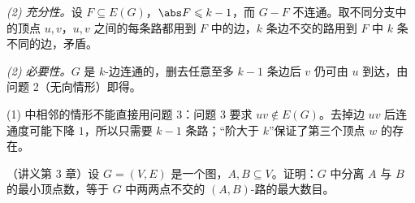 \begin{solution}
\emph{(2) 充分性。}设 $F\subseteq E(G)$，$\abs F\leqslant k-1$，而 $G-F$ 不连通。取不同分支中的顶点 $u,v$，$u,v$ 之间的每条路都用到 $F$ 中的边，$k$ 条边不交的路用到 $F$ 中 $k$ 条不同的边，矛盾。

\emph{(2) 必要性。}$G$ 是 $k$-边连通的，删去任意至多 $k-1$ 条边后 $v$ 仍可由 $u$ 到达，由问题 2（无向情形）即得。
\end{solution}
\begin{remark}
(1) 中相邻的情形不能直接用问题 3：问题 3 要求 $uv\notin E(G)$。去掉边 $uv$ 后连通度可能下降 $1$，所以只需要 $k-1$ 条路；“阶大于 $k$”保证了第三个顶点 $w$ 的存在。
\end{remark}

\begin{workedexample}[问题 5]\label{we:yan-ch3-problems:ab-menger}
（讲义第 3 章）设 $G=(V,E)$ 是一个图，$A,B\subseteq V$。证明：$G$ 中分离 $A$ 与 $B$ 的最小顶点数，等于 $G$ 中两两点不交的 $(A,B)$-路的最大数目。
\end{workedexample}
